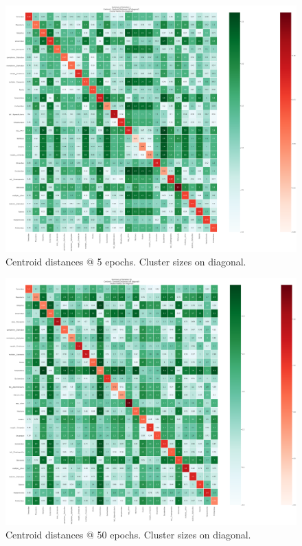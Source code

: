 \documentclass[10pt]{article}
\begin{document}
\begin{figure}
\includegraphics[angle=90, scale=.22]{summarize1.png}
\caption{Centroid distances @ 5 epochs. Cluster sizes on diagonal.}
\end{figure}

\begin{figure}
\includegraphics[angle=90, scale=.22]{summarize10.png}
\caption{Centroid distances @ 50 epochs. Cluster sizes on diagonal.}
\end{figure}
\end{document}
